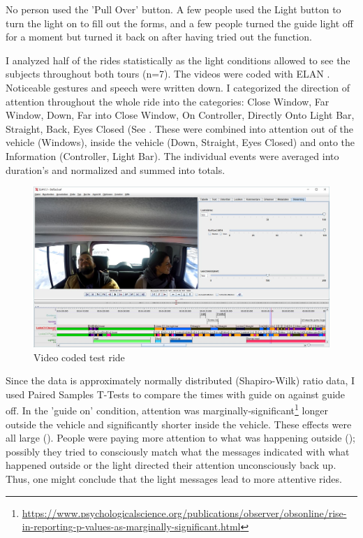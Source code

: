 No person used the 'Pull Over' button. A few people used the Light button to turn the light on to fill out the forms, and a few people turned the guide light off for a moment but turned it back on after having tried out the function. 

I analyzed half of the rides statistically as the light conditions allowed to see the subjects throughout both tours (n=7). The videos were coded with ELAN \citep{Wittenburg2006ELAN:Research}. Noticeable gestures and speech were written down. I categorized the direction of attention throughout the whole ride into the categories: Close Window, Far Window, Down, Far into Close Window, On Controller, Directly Onto Light Bar, Straight, Back, Eyes Closed (See \emph{}. These were combined into attention out of the vehicle (Windows), inside the vehicle (Down, Straight, Eyes Closed) and onto the Information (Controller, Light Bar). The individual events were averaged into duration's and normalized and summed into totals.
\begin{figure}
    \includegraphics[width=1\textwidth]{fig/StefSas.JPG}
    \caption[Video Coding]{Video coded test ride}
    \label{fig:videocode}
\end{figure}
Since the data is approximately normally distributed (Shapiro-Wilk) ratio data, I used Paired Samples T-Tests to compare the times with guide on against guide off. In the 'guide on' condition, attention was marginally-significant\footnote{\url{https://www.psychologicalscience.org/publications/observer/obsonline/rise-in-reporting-p-values-as-marginally-significant.html}} longer outside the vehicle and significantly shorter inside the vehicle. These effects were all large (\emph{}). People were paying more attention to what was happening outside (\emph{}); possibly they tried to consciously match what the messages indicated with what happened outside or the light directed their attention unconsciously back up. Thus, one might conclude that the light messages lead to more attentive rides. 

